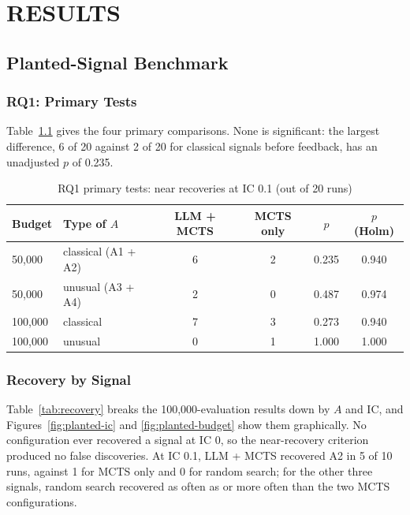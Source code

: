 \documentclass[12pt,a4paper,oneside]{book}
\theoremstyle{definition}
\begin{document}
\chapter{RESULTS}
\label{ch4}

\section{Planted-Signal Benchmark}
\label{sec:res-planted}

\subsection{RQ1: Primary Tests}

Table~\ref{tab:primary} gives the four primary comparisons. None is significant: the largest difference, 6 of 20 against 2 of 20 for classical signals before feedback, has an unadjusted $p$ of 0.235.

\begin{table}[H]
\centering
\caption{RQ1 primary tests: near recoveries at IC 0.1 (out of 20 runs)}
\label{tab:primary}
\small
\begin{tabular}{llcccc}
\toprule
\textbf{Budget} & \textbf{Type of $A$} & \textbf{LLM + MCTS} & \textbf{MCTS only} & \textbf{$p$} & \textbf{$p$ (Holm)} \\
\midrule
50,000 & classical (A1 + A2) & 6 & 2 & 0.235 & 0.940 \\
50,000 & unusual (A3 + A4) & 2 & 0 & 0.487 & 0.974 \\
100,000 & classical & 7 & 3 & 0.273 & 0.940 \\
100,000 & unusual & 0 & 1 & 1.000 & 1.000 \\
\bottomrule
\end{tabular}
\end{table}

\subsection{Recovery by Signal}

Table~\ref{tab:recovery} breaks the 100,000-evaluation results down by $A$ and IC, and Figures~\ref{fig:planted-ic} and \ref{fig:planted-budget} show them graphically. No configuration ever recovered a signal at IC 0, so the near-recovery criterion produced no false discoveries. At IC 0.1, LLM + MCTS recovered A2 in 5 of 10 runs, against 1 for MCTS only and 0 for random search; for the other three signals, random search recovered as often as or more often than the two MCTS configurations.
\end{document}
